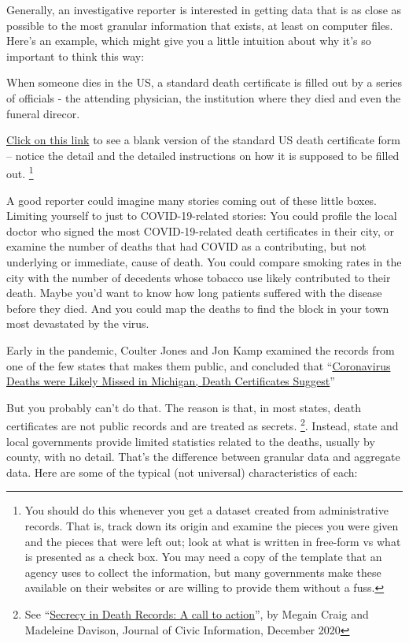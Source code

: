 \documentclass[
  letterpaper,
  DIV=11,
  numbers=noendperiod]{scrreprt}
\begin{document}
Generally, an investigative reporter is interested in getting data that
is as close as possible to the most granular information that exists, at
least on computer files. Here's an example, which might give you a
little intuition about why it's so important to think this way:

When someone dies in the US, a standard death certificate is filled out
by a series of officials - the attending physician, the institution
where they died and even the funeral direcor.

\href{https://www.cdc.gov/nchs/data/dvs/death11-03final-acc.pdf}{Click
on this link} to see a blank version of the standard US death
certificate form -- notice the detail and the detailed instructions on
how it is supposed to be filled out. \footnote{You should do this
  whenever you get a dataset created from administrative records. That
  is, track down its origin and examine the pieces you were given and
  the pieces that were left out; look at what is written in free-form vs
  what is presented as a check box. You may need a copy of the template
  that an agency uses to collect the information, but many governments
  make these available on their websites or are willing to provide them
  without a fuss.}

A good reporter could imagine many stories coming out of these little
boxes. Limiting yourself to just to COVID-19-related stories: You could
profile the local doctor who signed the most COVID-19-related death
certificates in their city, or examine the number of deaths that had
COVID as a contributing, but not underlying or immediate, cause of
death. You could compare smoking rates in the city with the number of
decedents whose tobacco use likely contributed to their death. Maybe
you'd want to know how long patients suffered with the disease before
they died. And you could map the deaths to find the block in your town
most devastated by the virus.

Early in the pandemic, Coulter Jones and Jon Kamp examined the records
from one of the few states that makes them public, and concluded that
``\href{https://www.wsj.com/articles/coronavirus-deaths-were-likely-missed-in-michigan-death-certificates-suggest-11590073280\%5D\%20\%5E\%5BWall\%20Street\%20Journal,\%20May\%2021,\%202020}{Coronavirus
Deaths were Likely Missed in Michigan, Death Certificates Suggest}''

But you probably can't do that. The reason is that, in most states,
death certificates are not public records and are treated as secrets.
\footnote{See
  ``\href{https://www.researchgate.net/publication/348322257_Secrecy_in_Death_Records_A_Call_to_Action}{Secrecy
  in Death Records: A call to action}'', by Megain Craig and Madeleine
  Davison, Journal of Civic Information, December 2020}. Instead, state
and local governments provide limited statistics related to the deaths,
usually by county, with no detail. That's the difference between
granular data and aggregate data. Here are some of the typical (not
universal) characteristics of each:
\end{document}
